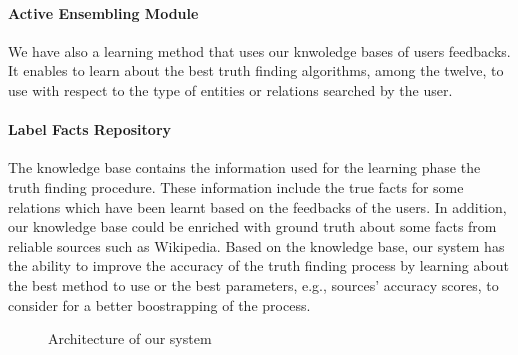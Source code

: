 \paragraph*{Active Ensembling Module} We have also a learning method that uses our knwoledge
bases of users feedbacks. It enables to learn about the best truth finding algorithms,
among the twelve, to use with respect to the type of entities or relations searched by 
the user.

\paragraph*{Label Facts Repository}The knowledge base contains the information used for the learning
phase the truth finding procedure. These information include the true facts for some relations
which have been learnt based on the feedbacks of the users. In addition, our knowledge base could
be enriched with ground truth about some facts from reliable sources such as Wikipedia. Based on 
the knowledge base, our system has the ability to improve the accuracy of the truth finding process
by learning about the best method to use or the best parameters, e.g., sources' accuracy scores, to 
consider for a better boostrapping of the process.

\begin{figure}[ht]
\caption{Architecture of our system}\label{system_architecture}
\end{figure}
